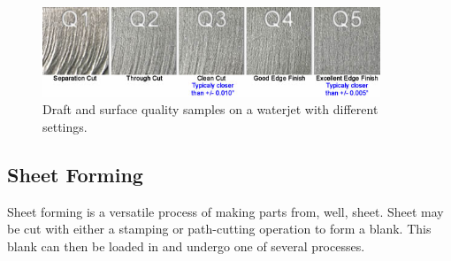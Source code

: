  \begin{figure}[H] \centering
 	\includegraphics[width=0.9\textwidth]{imgs/waterjet_draft.jpeg}
 	\caption{Draft and surface quality samples on a waterjet with different settings.}
 \end{figure}

 \subsection{Sheet Forming}
 Sheet forming is a versatile process of making parts from, well, sheet. Sheet may be cut with either a stamping or path-cutting operation to form a blank. This blank can then be loaded in and undergo one of several processes.
 
